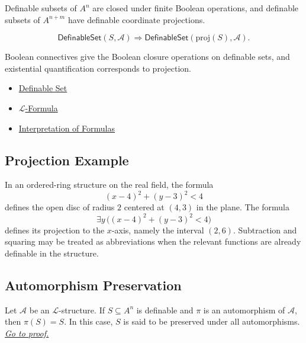 \begin{remark*}
Definable subsets of $A^n$ are closed under finite Boolean operations, and
definable subsets of $A^{n+m}$ have definable coordinate projections.
\end{remark*}

\begin{remark*}
\[
\mathsf{DefinableSet}(S,\mathcal{A})
\Longrightarrow
\mathsf{DefinableSet}(\mathrm{proj}(S),\mathcal{A}).
\]
\end{remark*}

\begin{remark*}[Interpretation]
Boolean connectives give the Boolean closure operations on definable sets, and
existential quantification corresponds to projection.
\end{remark*}

\begin{dependencies}
\begin{itemize}
  \item \hyperref[def:definable-set]{Definable Set}
  \item \hyperref[def:l-formula]{$\mathcal{L}$-Formula}
  \item \hyperref[def:formula-interpretation]{Interpretation of Formulas}
\end{itemize}
\end{dependencies}

\subsection{Projection Example}

\begin{example*}
In an ordered-ring structure on the real field, the formula
\[
  (x-4)^2+(y-3)^2<4
\]
defines the open disc of radius $2$ centered at $(4,3)$ in the plane. The
formula
\[
  \exists y\,\bigl((x-4)^2+(y-3)^2<4\bigr)
\]
defines its projection to the $x$-axis, namely the interval $(2,6)$.
Subtraction and squaring may be treated as abbreviations when the relevant
functions are already definable in the structure.
\end{example*}

\subsection{Automorphism Preservation}

\begin{proposition}\label{prop:definable-sets-preserved-under-automorphisms}
Let $\mathcal{A}$ be an $\mathcal{L}$-structure. If
$S\subseteq A^n$ is definable and $\pi$ is an automorphism of $\mathcal{A}$,
then $\pi(S)=S$. In this case, $S$ is said to be preserved under all
automorphisms.
\hyperref[prf:definable-sets-preserved-under-automorphisms]{\textit{Go to proof.}}
\end{proposition}

